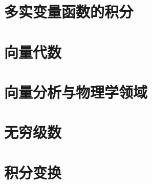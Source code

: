 \chapter{多实变量函数的积分}











\chapter{向量代数}



\chapter{向量分析与物理学领域}











\chapter{无穷级数}






\chapter{积分变换}



